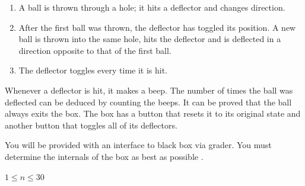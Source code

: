 \begin{enumerate}
\item A ball is thrown through a hole; it hits a deflector and changes direction. 
\item After the first ball was thrown, the deflector has toggled its position. A new ball is thrown into the same hole, hits the deflector and is deflected in a direction opposite to that of the first ball. 
\item  The deflector toggles every time it is hit.
\end{enumerate}

Whenever a deflector is hit, it makes a beep. The number of times the ball was deflected can be deduced by counting the beeps. It can be proved that the ball always exits the box. The box has a button that resets it to its original state and another button that toggles all of its deflectors. 

You will be provided with an interface to black box via grader. You must determine the internals of the box as best as possible . 


$1 \le n \le 30$